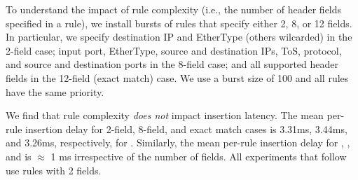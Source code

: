 
To understand the impact of rule complexity (i.e., the number of header 
fields specified in a rule), we install bursts of rules that specify either
2, 8, or 12 fields. In particular, we specify destination IP and EtherType
(others wilcarded) in the 2-field case; input port, EtherType, source and
destination IPs, ToS, protocol, and source and destination ports in the
8-field case; and all supported header fields in the 12-field (exact match)
case. We use a burst size of 100 and all rules have the same priority.


We find that rule complexity {\em does not} impact insertion latency. The
mean per-rule insertion delay for 2-field, 8-field, and exact
match cases is 3.31ms, 3.44ms, and 3.26ms, respectively, for \BroadcomOne.
Similarly, the mean per-rule insertion delay for \Intel, \IBM, and
\BroadcomThree is $\approx$ 1 ms irrespective of the number of fields. 
All experiments that follow use rules with 2 fields.





